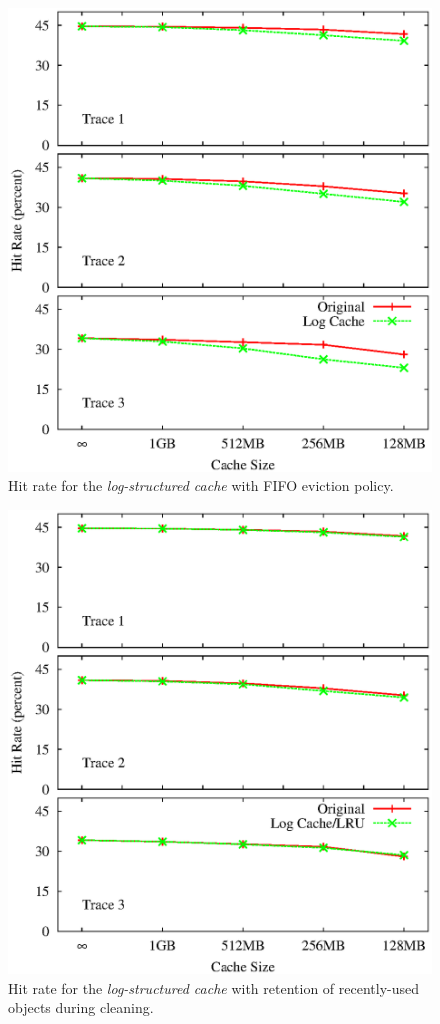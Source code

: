 \documentclass[letterpaper,twocolumn,10pt]{article}
\begin{document}
\begin{figure}[t]
  \begin{center}
    \includegraphics[width=0.9\columnwidth]{graphs/hit-rate-2}
  \end{center}
  \caption{Hit rate for the \emph{log-structured cache} with FIFO eviction
    policy.}
  \label{fig:hit-rate} 
\vspace{-0.2in}
\end{figure}

\begin{figure}
\centering
\includegraphics[width=0.9\columnwidth]{graphs/hit-rate-3}
\caption{Hit rate for the \emph{log-structured cache} with retention
  of recently-used objects during cleaning.}
\label{fig:hit-rate2}
\end{figure}
\end{document}
